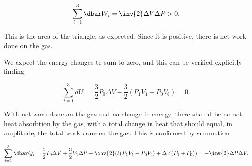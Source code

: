 {\begin{equation}\label{eqn:basicStatMechProblemSet4Problem2:280}
\sum_{i = 1}^3 \dbar W_i = \inv{2} \Delta V \Delta P > 0.
\end{equation}

This is the area of the triangle, as expected.  Since it is positive, there is net work done on the gas.

We expect the energy changes to sum to zero, and this can be verified explicitly finding

\begin{equation}\label{eqn:basicStatMechProblemSet4Problem2:300}
\sum_{i = 1}^3 d U_i = 
\frac{3}{2} P_0 \Delta V 
-\frac{3}{2} ( P_1 V_1 - P_0 V_0 ) = 0.
\end{equation}

With net work done on the gas and no change in energy, there should be no net heat absorbtion by the gas, with a total change in heat that should equal, in amplitude, the total work done on the gas.  This is confirmed by summation

\begin{equation}\label{eqn:basicStatMechProblemSet4Problem2:320}
\sum_{i = 1}^3 \dbar Q_i = 
\frac{5}{2} P_0 \Delta V 
+\frac{3}{2} V_1 \Delta P 
-\inv{2} ( 3(P_1 V_1 - P_0 V_0) + \Delta V (P_1 + P_0)) 
=
-\inv{2} \Delta P \Delta V.
\end{equation}

}
